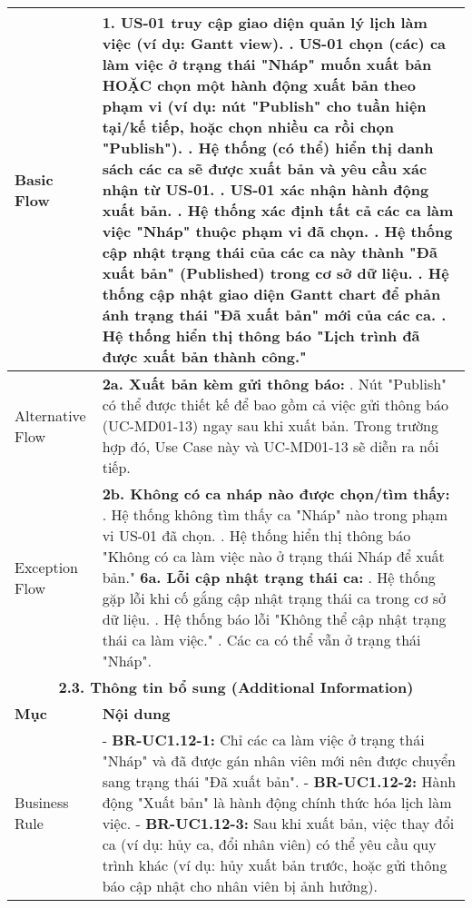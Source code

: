 \begin{longtable}{|m{4cm}|p{11cm}|}
Basic Flow & 1. US-01 truy cập giao diện quản lý lịch làm việc (ví dụ: Gantt view). \newline 2. US-01 chọn (các) ca làm việc ở trạng thái "Nháp" muốn xuất bản HOẶC chọn một hành động xuất bản theo phạm vi (ví dụ: nút "Publish" cho tuần hiện tại/kế tiếp, hoặc chọn nhiều ca rồi chọn "Publish"). \newline 3. Hệ thống (có thể) hiển thị danh sách các ca sẽ được xuất bản và yêu cầu xác nhận từ US-01. \newline 4. US-01 xác nhận hành động xuất bản. \newline 5. Hệ thống xác định tất cả các ca làm việc "Nháp" thuộc phạm vi đã chọn. \newline 6. Hệ thống cập nhật trạng thái của các ca này thành "Đã xuất bản" (Published) trong cơ sở dữ liệu. \newline 7. Hệ thống cập nhật giao diện Gantt chart để phản ánh trạng thái "Đã xuất bản" mới của các ca. \newline 8. Hệ thống hiển thị thông báo "Lịch trình đã được xuất bản thành công." \\
\hline
Alternative Flow & \textbf{2a. Xuất bản kèm gửi thông báo:} \newline    1. Nút "Publish" có thể được thiết kế để bao gồm cả việc gửi thông báo (UC-MD01-13) ngay sau khi xuất bản. Trong trường hợp đó, Use Case này và UC-MD01-13 sẽ diễn ra nối tiếp. \\
\hline
Exception Flow & \textbf{2b. Không có ca nháp nào được chọn/tìm thấy:} \newline    1. Hệ thống không tìm thấy ca "Nháp" nào trong phạm vi US-01 đã chọn. \newline    2. Hệ thống hiển thị thông báo "Không có ca làm việc nào ở trạng thái Nháp để xuất bản." \newline \textbf{6a. Lỗi cập nhật trạng thái ca:} \newline    1. Hệ thống gặp lỗi khi cố gắng cập nhật trạng thái ca trong cơ sở dữ liệu. \newline    2. Hệ thống báo lỗi "Không thể cập nhật trạng thái ca làm việc." \newline    3. Các ca có thể vẫn ở trạng thái "Nháp". \\
\hline
\multicolumn{2}{|c|}{\textbf{2.3. Thông tin bổ sung (Additional Information)}} \\
\hline
\textbf{Mục} & \textbf{Nội dung} \\
\hline
Business Rule & - \textbf{BR-UC1.12-1:} Chỉ các ca làm việc ở trạng thái "Nháp" và đã được gán nhân viên mới nên được chuyển sang trạng thái "Đã xuất bản". \newline - \textbf{BR-UC1.12-2:} Hành động "Xuất bản" là hành động chính thức hóa lịch làm việc. \newline - \textbf{BR-UC1.12-3:} Sau khi xuất bản, việc thay đổi ca (ví dụ: hủy ca, đổi nhân viên) có thể yêu cầu quy trình khác (ví dụ: hủy xuất bản trước, hoặc gửi thông báo cập nhật cho nhân viên bị ảnh hưởng). \\

\end{longtable}
